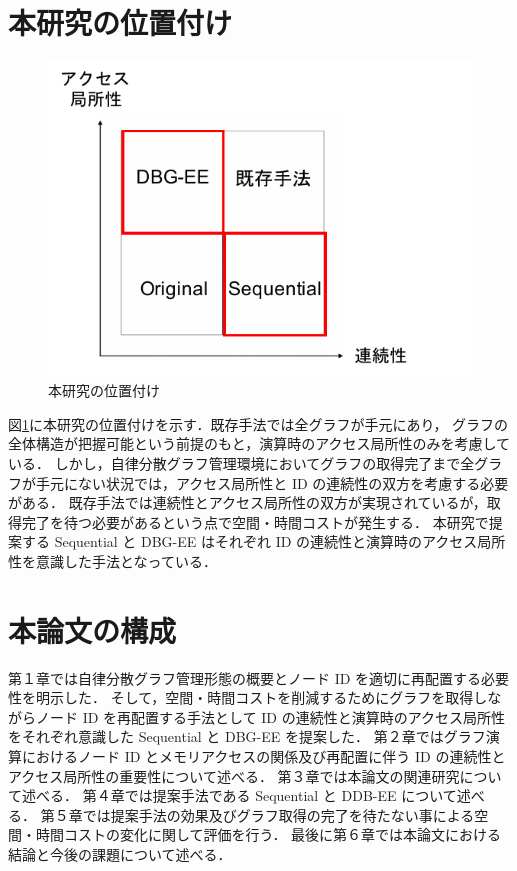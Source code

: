 \section{本研究の位置付け}
\begin{figure}[t]
  \centering
  \includegraphics[width=\linewidth]{./figure/research_position.pdf}
  \caption{本研究の位置付け}
  \label{research_position}
\end{figure}
図\ref{research_position}に本研究の位置付けを示す．既存手法では全グラフが手元にあり，
グラフの全体構造が把握可能という前提のもと，演算時のアクセス局所性のみを考慮している．
しかし，自律分散グラフ管理環境においてグラフの取得完了まで全グラフが手元にない状況では，アクセス局所性と ID の連続性の双方を考慮する必要がある．
既存手法では連続性とアクセス局所性の双方が実現されているが，取得完了を待つ必要があるという点で空間・時間コストが発生する．
本研究で提案する Sequential と DBG-EE はそれぞれ ID の連続性と演算時のアクセス局所性を意識した手法となっている．

\section{本論文の構成}
第１章では自律分散グラフ管理形態の概要とノード ID を適切に再配置する必要性を明示した．
そして，空間・時間コストを削減するためにグラフを取得しながらノード ID を再配置する手法として ID の連続性と演算時のアクセス局所性をそれぞれ意識した Sequential と DBG-EE を提案した．
第２章ではグラフ演算におけるノード ID とメモリアクセスの関係及び再配置に伴う ID の連続性とアクセス局所性の重要性について述べる．
第３章では本論文の関連研究について述べる．
第４章では提案手法である Sequential と DDB-EE について述べる．
第５章では提案手法の効果及びグラフ取得の完了を待たない事による空間・時間コストの変化に関して評価を行う．
最後に第６章では本論文における結論と今後の課題について述べる．